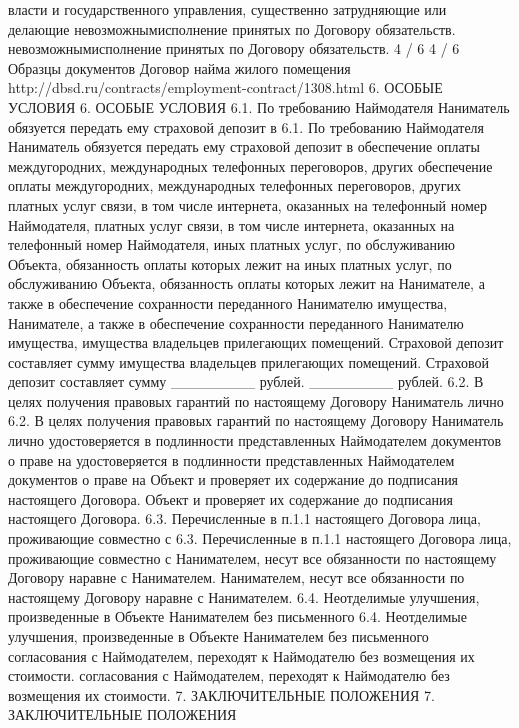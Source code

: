 власти и государственного управления, существенно затрудняющие или делающие
невозможнымисполнение принятых по Договору обязательств.
невозможнымисполнение принятых по Договору обязательств.
                                                4 / 6
                                                4 / 6
Образцы документов
Договор найма жилого помещения
http://dbsd.ru/contracts/employment-contract/1308.html
6. ОСОБЫЕ УСЛОВИЯ
6. ОСОБЫЕ УСЛОВИЯ
6.1. По требованию Наймодателя Наниматель обязуется передать ему страховой
депозит в
6.1. По требованию Наймодателя Наниматель обязуется передать ему страховой
депозит в
обеспечение оплаты междугородних, международных телефонных переговоров, других
обеспечение оплаты междугородних, международных телефонных переговоров, других
платных услуг связи, в том числе интернета, оказанных на телефонный номер
Наймодателя,
платных услуг связи, в том числе интернета, оказанных на телефонный номер
Наймодателя,
иных платных услуг, по обслуживанию Объекта, обязанность оплаты которых лежит на
иных платных услуг, по обслуживанию Объекта, обязанность оплаты которых лежит на
Нанимателе, а также в обеспечение сохранности переданного Нанимателю имущества,
Нанимателе, а также в обеспечение сохранности переданного Нанимателю имущества,
имущества владельцев прилегающих помещений. Страховой депозит составляет сумму
имущества владельцев прилегающих помещений. Страховой депозит составляет сумму
________ рублей.
________ рублей.
6.2. В целях получения правовых гарантий по настоящему Договору Наниматель лично
6.2. В целях получения правовых гарантий по настоящему Договору Наниматель лично
удостоверяется в подлинности представленных Наймодателем документов о праве на
удостоверяется в подлинности представленных Наймодателем документов о праве на
Объект и проверяет их содержание до подписания настоящего Договора.
Объект и проверяет их содержание до подписания настоящего Договора.
6.3. Перечисленные в п.1.1 настоящего Договора лица, проживающие совместно с
6.3. Перечисленные в п.1.1 настоящего Договора лица, проживающие совместно с
Нанимателем, несут все обязанности по настоящему Договору наравне с Нанимателем.
Нанимателем, несут все обязанности по настоящему Договору наравне с Нанимателем.
6.4. Неотделимые улучшения, произведенные в Объекте Нанимателем без письменного
6.4. Неотделимые улучшения, произведенные в Объекте Нанимателем без письменного
согласования с Наймодателем, переходят к Наймодателю без возмещения их
стоимости.
согласования с Наймодателем, переходят к Наймодателю без возмещения их
стоимости.
7. ЗАКЛЮЧИТЕЛЬНЫЕ ПОЛОЖЕНИЯ
7. ЗАКЛЮЧИТЕЛЬНЫЕ ПОЛОЖЕНИЯ
